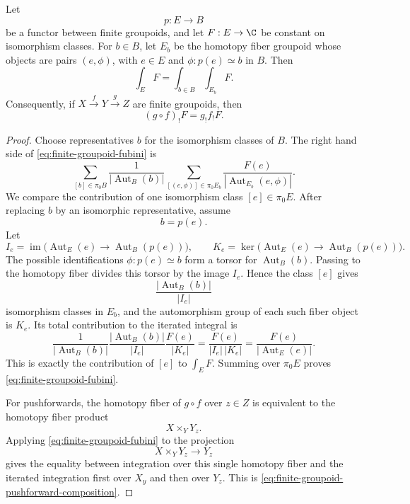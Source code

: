 \begin{lemma}
\label{lem:finite-groupoid-fubini}
Let
\[
  p:E\to B
\]
be a functor between finite groupoids, and let \(F:E\to\C\) be constant on
isomorphism classes.  For \(b\in B\), let \(E_b\) be the homotopy fiber
groupoid whose objects are pairs \((e,\phi)\), with \(e\in E\) and
\(\phi:p(e)\simeq b\) in \(B\).  Then
\begin{equation}
  \int_E F
  =
  \int_{b\in B}\int_{E_b} F.
  \label{eq:finite-groupoid-fubini}
\end{equation}
Consequently, if \(X\xrightarrow{f}Y\xrightarrow{g}Z\) are finite groupoids,
then
\begin{equation}
  (g\circ f)_!F=g_!f_!F.
  \label{eq:finite-groupoid-pushforward-composition}
\end{equation}
\end{lemma}

\begin{proof}
Choose representatives \(b\) for the isomorphism classes of \(B\).  The
right hand side of \eqref{eq:finite-groupoid-fubini} is
\[
  \sum_{[b]\in\pi_0B}
  \frac{1}{|\operatorname{Aut}_B(b)|}
  \sum_{[(e,\phi)]\in\pi_0E_b}
  \frac{F(e)}{|\operatorname{Aut}_{E_b}(e,\phi)|}.
\]
We compare the contribution of one isomorphism class \([e]\in\pi_0E\).
After replacing \(b\) by an isomorphic representative, assume
\[
  b=p(e).
\]
Let
\[
  I_e=\operatorname{im}\bigl(\operatorname{Aut}_E(e)\to
  \operatorname{Aut}_B(p(e))\bigr),
  \qquad
  K_e=\ker\bigl(\operatorname{Aut}_E(e)\to
  \operatorname{Aut}_B(p(e))\bigr).
\]
The possible identifications \(\phi:p(e)\simeq b\) form a torsor for
\(\operatorname{Aut}_B(b)\).  Passing to the homotopy fiber divides this
torsor by the image \(I_e\).  Hence the class \([e]\) gives
\[
  \frac{|\operatorname{Aut}_B(b)|}{|I_e|}
\]
isomorphism classes in \(E_b\), and the automorphism group of each such
fiber object is \(K_e\).  Its total contribution to the iterated integral is
\[
  \frac{1}{|\operatorname{Aut}_B(b)|}
  \frac{|\operatorname{Aut}_B(b)|}{|I_e|}
  \frac{F(e)}{|K_e|}
  =
  \frac{F(e)}{|I_e|\,|K_e|}
  =
  \frac{F(e)}{|\operatorname{Aut}_E(e)|}.
\]
This is exactly the contribution of \([e]\) to \(\int_EF\).  Summing over
\(\pi_0E\) proves \eqref{eq:finite-groupoid-fubini}.

For pushforwards, the homotopy fiber of \(g\circ f\) over \(z\in Z\) is
equivalent to the homotopy fiber product
\[
  X\times_Y Y_z.
\]
Applying \eqref{eq:finite-groupoid-fubini} to the projection
\[
  X\times_Y Y_z\to Y_z
\]
gives the equality between integration over this single homotopy fiber and
the iterated integration first over \(X_y\) and then over \(Y_z\).  This is
\eqref{eq:finite-groupoid-pushforward-composition}.
\end{proof}

